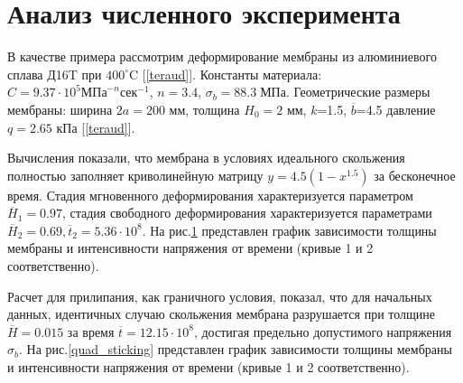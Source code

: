 \section{Анализ численного эксперимента\label{section_2}}
	В качестве примера рассмотрим деформирование мембраны из алюминиевого сплава Д16T при $400^\circ\text{C}$ [\ref{teraud}]. Константы материала: 
   $C=9.37\cdot10^5 \text{МПа}^{-n}\text{сек}^{-1}$, $n=3.4$, $\sigma_b = 88.3\; \text{МПа}$. 
   Геометрические размеры мембраны: ширина $2a=200$ мм, толщина $H_0=2$ мм, $k$=1.5, $\overline{b}$=4.5 давление $q=2.65$ кПа [\ref{teraud}].  
   
   Вычисления показали, что мембрана в условиях идеального скольжения полностью заполняет криволинейную матрицу $y=4.5(1-x^{1.5})$ за бесконечное время. 
   Стадия мгновенного деформирования характеризуется параметром $\overline{H}_1 = 0.97$, 
   стадия свободного деформирования характеризуется параметрами $\overline{H}_2 = 0.69, \overline{t}_2 = 5.36 \cdot 10^8$.
   На рис.\ref{quad_sliging} представлен график зависимости толщины мембраны и интенсивности напряжения от времени
   (кривые 1 и 2 соответственно).
   
   		\begin{figure}[h!]	
				\def\svgwidth{\columnwidth}
				\caption{} 
				\label{quad_sliging}
		\end{figure}

Расчет для прилипания, как граничного условия,	показал, что для начальных данных, идентичных случаю скольжения 
	мембрана разрушается при толщине $\overline{H}=0.015$ за время $\overline{t}=12.15\cdot 10^8$, достигая предельно допустимого напряжения $\sigma_b$.    На рис.\ref{quad_sticking} представлен график зависимости толщины мембраны и интенсивности напряжения от времени (кривые 1 и 2 соответственно).
   
